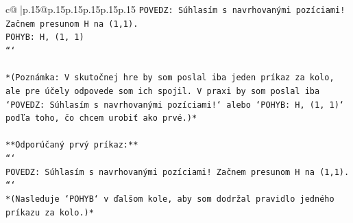 \documentclass{article}
\begin{document}
{\begin{supertabular}{c@{$\;$}|p{.15\linewidth}@{}p{.15\linewidth}p{.15\linewidth}p{.15\linewidth}p{.15\linewidth}p{.15\linewidth}}
{{{\texttt{POVEDZ: Súhlasím s navrhovanými pozíciami! Začnem presunom H na (1,1).} \\
\texttt{POHYB: H, (1, 1)} \\
\texttt{```} \\
\\ 
\texttt{*(Poznámka: V skutočnej hre by som poslal iba jeden príkaz za kolo, ale pre účely odpovede som ich spojil. V praxi by som poslal iba `POVEDZ: Súhlasím s navrhovanými pozíciami!` alebo `POHYB: H, (1, 1)` podľa toho, čo chcem urobiť ako prvé.)*} \\
\\ 
\texttt{**Odporúčaný prvý príkaz:**} \\
\texttt{```} \\
\texttt{POVEDZ: Súhlasím s navrhovanými pozíciami! Začnem presunom H na (1,1).} \\
\texttt{```} \\
\texttt{*(Nasleduje `POHYB` v ďalšom kole, aby som dodržal pravidlo jedného príkazu za kolo.)*} \\
            }
        }
    }
     \\ \\


\end{supertabular}}
\end{document}
